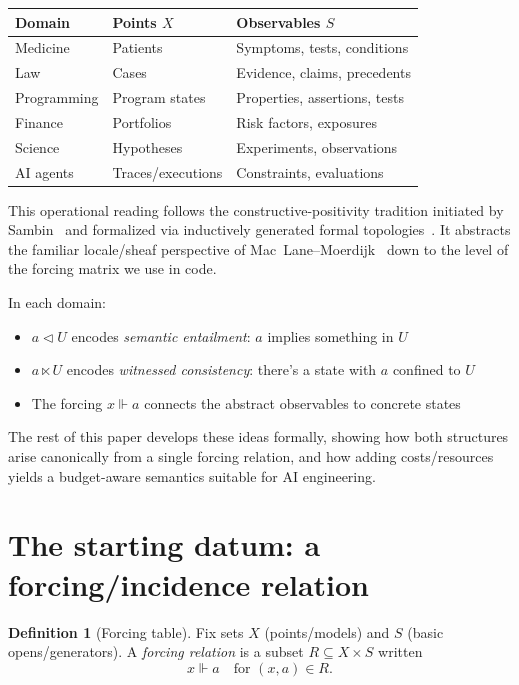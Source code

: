 \documentclass[11pt]{article}
\theoremstyle{definition}
\newtheorem{definition}{Definition}[section]
\theoremstyle{plain}
\newcommand{\forces}{\Vdash}
\newcommand{\ltimesrel}{\ltimes}
\newcommand{\covers}{\triangleleft}
\begin{document}
\begin{center}
\begin{tabular}{lll}
\toprule
\textbf{Domain} & \textbf{Points $X$} & \textbf{Observables $S$} \\
\midrule
Medicine & Patients & Symptoms, tests, conditions \\
Law & Cases & Evidence, claims, precedents \\
Programming & Program states & Properties, assertions, tests \\
Finance & Portfolios & Risk factors, exposures \\
Science & Hypotheses & Experiments, observations \\
AI agents & Traces/executions & Constraints, evaluations \\
\bottomrule
\end{tabular}
\end{center}

This operational reading follows the constructive-positivity tradition initiated by Sambin~\cite{Sambin-OUP-PositiveTopology}
and formalized via inductively generated formal topologies~\cite{CoquandSambinSmithValentini2003}.
It abstracts the familiar locale/sheaf perspective of Mac~Lane--Moerdijk~\cite{MacLaneMoerdijk1992} down to the level of the forcing matrix we use in code.

In each domain:
\begin{itemize}
  \item $a \covers U$ encodes \emph{semantic entailment}: $a$ implies something in $U$
  \item $a \ltimesrel U$ encodes \emph{witnessed consistency}: there's a state with $a$ confined to $U$
  \item The forcing $x \forces a$ connects the abstract observables to concrete states
\end{itemize}

The rest of this paper develops these ideas formally, showing how both structures arise canonically from a single forcing relation,
and how adding costs/resources yields a budget-aware semantics suitable for AI engineering.

\section{The starting datum: a forcing/incidence relation}

\begin{definition}[Forcing table]
Fix sets $X$ (points/models) and $S$ (basic opens/generators).
A \emph{forcing relation} is a subset $R\subseteq X\times S$ written
\[
x\forces a \quad\text{for }(x,a)\in R.
\]
\end{definition}
\end{document}
